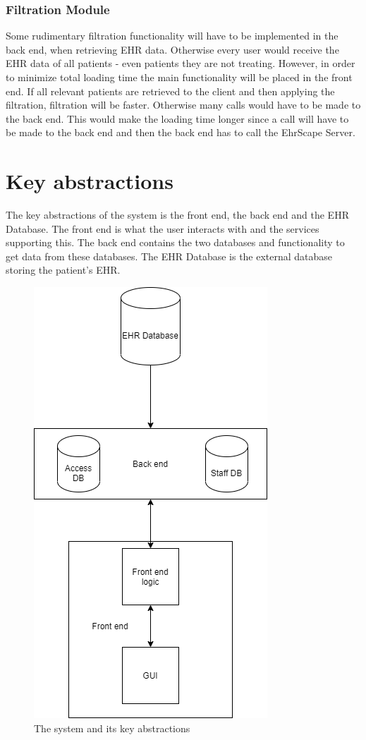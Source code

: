 \documentclass{article}
\begin{document}
\subsubsection{Filtration Module}
Some rudimentary filtration functionality will have to be implemented in the back end, when retrieving EHR data. Otherwise every user would receive the EHR data of all patients - even patients they are not treating. However, in order to minimize total loading time the main functionality will be placed in the front end. If all relevant patients are retrieved to the client and then applying the filtration, filtration will be faster. Otherwise many calls would have to be made to the back end. This would make the loading time longer since a call will have to be made to the back end and then the back end has to call the EhrScape Server.


\section{Key abstractions}
The key abstractions of the system is the front end, the back end and the EHR Database. The front end is what the user interacts with and the services supporting this. The back end contains the two databases and functionality to get data from these databases. The EHR Database is the external database storing the patient's EHR.

\begin{figure}[h]
    \centering
    \includegraphics[scale = 0.5]{key-abstraction}
    \caption{The system and its key abstractions}
    \label{fig:key-abstractions}
\end{figure}
\end{document}

